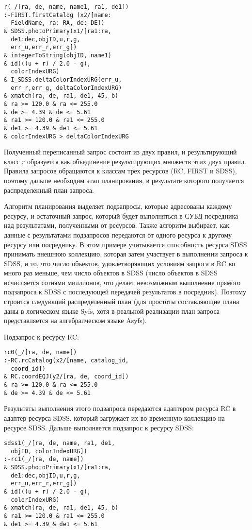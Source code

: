 \begin{multicols}{2}
\noindent
\begin{verbatim}
r(_/[ra, de, name, name1, ra1, de1])
:-FIRST.firstCatalog (x2/[name:
  FieldName, ra: RA, de: DE])
& SDSS.photoPrimary(x1/[ra1:ra,
  de1:dec,objID,u,r,g,
  err_u,err_r,err_g])
& integerToString(objID, name1)
& id(((u + r) / 2.0 - g),
  colorIndexURG)
& I_SDSS.deltaColorIndexURG(err_u,
  err_r,err_g, deltaColorIndexURG)
& xmatch(ra, de, ra1, de1, 45, b)
& ra >= 120.0 & ra <= 255.0
& de >= 4.39 & de <= 5.61
& ra1 >= 120.0 & ra1 <= 255.0
& de1 >= 4.39 & de1 <= 5.61
& colorIndexURG > deltaColorIndexURG
     \end{verbatim}
\vspace*{-12pt}

     Полученный переписанный запрос состоит из двух правил, и результирующий класс
$r$ образуется как объединение результирующих множеств этих двух правил. Правила
запросов обращаются к классам трех ресурсов (RC, FIRST и SDSS), поэтому дальше
необходим этап планирования, в результате которого получается распределенный план
запроса.

     Алгоритм планирования выделяет подзапросы, которые адресованы каждому
ресурсу, и остаточный запрос, который будет выполняться в СУБД посредника над
результатами, полученными от ресурсов. Также алгоритм выбирает, как данные с
результатами подзапросов передаются от одного ресурса к другому ресурсу или
посреднику. В этом примере учитывается способность ресурса SDSS принимать внешнюю
коллекцию, которая затем участвует в выполнении запроса к SDSS, и то, что число
объектов, удовлетворяющих условиям запроса в RC во много раз меньше, чем число
объектов в SDSS (число объектов в SDSS исчисляется сотнями миллионов, что делает
невозможным выполнение прямого подзапроса к SDSS с последующей передачей
результатов в посредник). Поэтому строится следующий распределенный план (для
простоты составляющие плана даны в логическом языке Syfs, хотя в реальной реализации
план запроса пред\-став\-ля\-ет\-ся на алгебраическом языке Asyfs).

     Подзапрос к ресурсу RC:
     \begin{verbatim}
rc0(_/[ra, de, name])
:-RC.rcCatalog(x2/[name, catalog_id,
  coord_id])
& RC.coordEQJ(y2/[ra, de, coord_id])
& ra >= 120.0 & ra <= 255.0
& de >= 4.39 & de <= 5.61
     \end{verbatim}
\vspace*{-12pt}


     Результаты выполнения этого подзапроса передаются адаптером ресурса RC в
адаптер ресурса SDSS, который загружает их во временную коллекцию на ресурсе SDSS.
Дальше выполняется подзапрос к ресурсу SDSS:
     \begin{verbatim}
sdss1(_/[ra, de, name, ra1, de1,
  objID, colorIndexURG])
:-rc1(_/[ra, de, name])
& SDSS.photoPrimary(x1/[ra1:ra,
  de1:dec,objID,u,r,g,
  err_u,err_r,err_g])
& id(((u + r) / 2.0 - g),
  colorIndexURG)
& xmatch(ra, de, ra1, de1, 45, b)
& ra1 >= 120.0 & ra1 <= 255.0
& de1 >= 4.39 & de1 <= 5.61
\end{verbatim}


\end{multicols}
